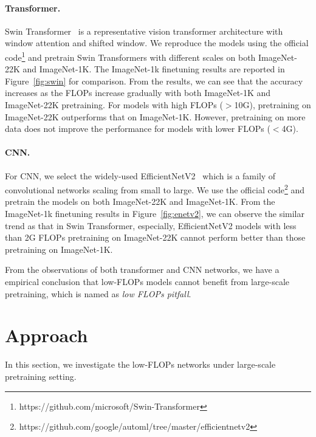 \documentclass[10pt,twocolumn,letterpaper]{article}
\begin{document}
\paragraph{Transformer.}
Swin Transformer~\cite{swin} is a representative vision transformer architecture with window attention and shifted window. We reproduce the models using the official code\footnote{https://github.com/microsoft/Swin-Transformer} and pretrain Swin Transformers with different scales on both ImageNet-22K and ImageNet-1K. The ImageNet-1k finetuning results are reported in Figure~\ref{fig:swin} for comparison. From the results, we can see that the accuracy increases as the FLOPs increase gradually with both ImageNet-1K and ImageNet-22K pretraining. For models with high FLOPs ($>$10G), pretraining on ImageNet-22K outperforms that on ImageNet-1K. However, pretraining on more data does not improve the performance for models with lower FLOPs ($<$4G).

\paragraph{CNN.}
For CNN, we select the widely-used EfficientNetV2~\cite{efficientnetv2} which is a family of convolutional networks scaling from small to large. We use the official code\footnote{https://github.com/google/automl/tree/master/efficientnetv2} and pretrain the models on both ImageNet-22K and ImageNet-1K. From the ImageNet-1k finetuning results in Figure~\ref{fig:enetv2}, we can observe the similar trend as that in Swin Transformer, especially, EfficientNetV2 models with less than 2G FLOPs pretraining on ImageNet-22K cannot perform better than those pretraining on ImageNet-1K.

From the observations of both transformer and CNN networks, we have a empirical conclusion that low-FLOPs models cannot benefit from large-scale pretraining, which is named as \emph{low FLOPs pitfall}.

\section{Approach}
In this section, we investigate the low-FLOPs networks under large-scale pretraining setting. 
\end{document}
